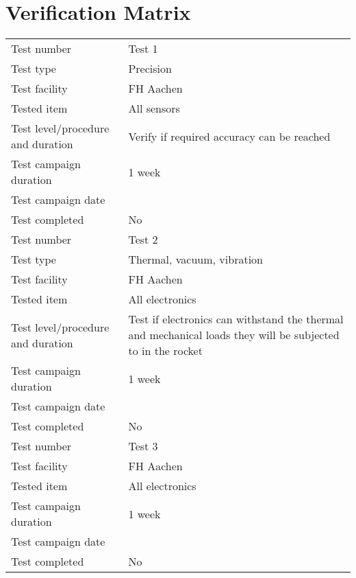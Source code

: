 \documentclass[11pt]{scrartcl}
\begin{document}
 \section{Verification Matrix}
 \begin{center}
	\begin{longtable}{| p{} | p{} |}
		\hline
		
		Test number & Test 1 \\
		Test type & Precision \\
		Test facility & FH Aachen \\
		Tested item & All sensors \\
		Test level/procedure and duration & Verify if required accuracy can be reached \\
		Test campaign duration & 1 week \\
		Test campaign date &  \\
		Test completed & No \\
		
		\hline\hline
		
		Test number & Test 2 \\
		Test type & Thermal, vacuum, vibration \\
		Test facility & FH Aachen \\
		Tested item & All electronics \\
		Test level/procedure and duration & Test if electronics can withstand the thermal and mechanical loads they will be subjected to in the rocket \\
		Test campaign duration & 1 week \\
		Test campaign date &  \\
		Test completed & No \\
		
		\hline\hline
		
		Test number & Test 3 \\
		Test facility & FH Aachen \\
		Tested item & All electronics \\
		Test campaign duration & 1 week \\
		Test campaign date &  \\
		Test completed & No \\
		
		\hline
		
	\end{longtable}
\end{center}
 
\end{document}
